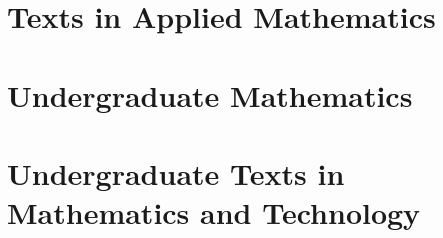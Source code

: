 \documentclass{article}
\begin{document}
    \section{Texts in Applied Mathematics}
    \section{Undergraduate Mathematics}
    \section{Undergraduate Texts in Mathematics and Technology}
  
\end{document}
